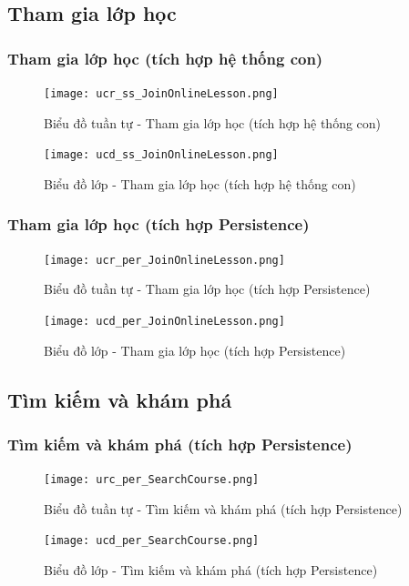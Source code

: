 \documentclass[./../main.tex]{subfiles}
\begin{document}
\subsection{Tham gia lớp học}
\subsubsection{Tham gia lớp học (tích hợp hệ thống con)}
\begin{figure}[H]
    \centering
    \texttt{[image: ucr\_ss\_JoinOnlineLesson.png]}
    \caption{Biểu đồ tuần tự - Tham gia lớp học (tích hợp hệ thống con)}
\end{figure}
\begin{figure}[H]
    \centering
    \texttt{[image: ucd\_ss\_JoinOnlineLesson.png]}
    \caption{Biểu đồ lớp - Tham gia lớp học (tích hợp hệ thống con)}
\end{figure}
\subsubsection{Tham gia lớp học (tích hợp Persistence)}
\begin{figure}[H]
    \centering
    \texttt{[image: ucr\_per\_JoinOnlineLesson.png]}
    \caption{Biểu đồ tuần tự - Tham gia lớp học (tích hợp Persistence)}
\end{figure}
\begin{figure}[H]
    \centering
    \texttt{[image: ucd\_per\_JoinOnlineLesson.png]}
    \caption{Biểu đồ lớp - Tham gia lớp học (tích hợp Persistence)}
\end{figure}

\subsection{Tìm kiếm và khám phá}
\subsubsection{Tìm kiếm và khám phá (tích hợp Persistence)}
\begin{figure}[H]
    \centering
    \texttt{[image: urc\_per\_SearchCourse.png]}
    \caption{Biểu đồ tuần tự - Tìm kiếm và khám phá (tích hợp Persistence)}
\end{figure}
\begin{figure}[H]
    \centering
    \texttt{[image: ucd\_per\_SearchCourse.png]}
    \caption{Biểu đồ lớp - Tìm kiếm và khám phá (tích hợp Persistence)}
\end{figure}
\end{document}
